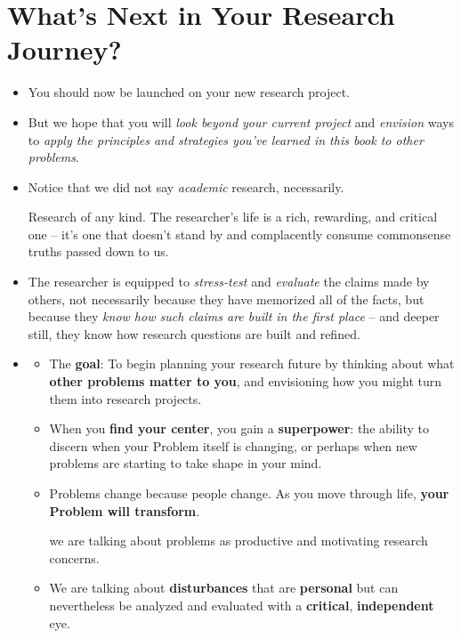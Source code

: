 \documentclass[11pt]{article}
\begin{document}
\section{What's Next in Your Research Journey?}
\begin{itemize}
\item You should now be launched on your new research project. 

\item But we hope that you will \emph{look beyond your current project} and \emph{envision} ways to \emph{apply the principles and strategies you’ve learned in this book to other problems}.

\item Notice that we did not say \emph{academic} research, necessarily. 

Research of any kind. The researcher’s life is a rich, rewarding, and critical one -- it’s one that doesn’t stand by and complacently consume commonsense truths passed down to us.

\item The researcher is equipped to \emph{stress-test} and \emph{evaluate} the claims made by others, not necessarily because they have memorized all of the facts, but because they \emph{know how such claims are built in the first place} -- and deeper still, they know how research questions are built and refined.

\item \begin{exercise}
\begin{itemize}
\item The \textbf{goal}: To begin planning your research future by thinking about what \textbf{other problems matter to you}, and envisioning how you might turn them into research projects.

\item When you \textbf{find your center}, you gain a \textbf{superpower}: the ability to discern when your Problem itself is changing, or
perhaps when new problems are starting to take shape in your mind. 

\item Problems change because people change. As you move through life, \textbf{your Problem will transform}. 

we are talking about problems as productive and motivating research concerns.

\item We are talking about \textbf{disturbances} that are \textbf{personal} but can nevertheless be analyzed and evaluated with a \textbf{critical}, \textbf{independent} eye.


\end{itemize}
\end{exercise}
\end{itemize}
\end{document}
